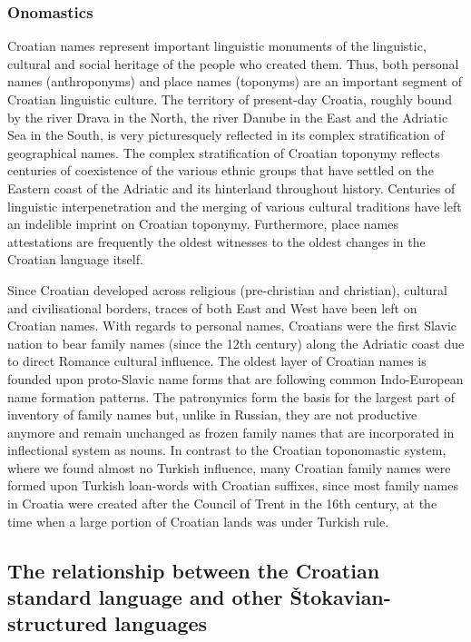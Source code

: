\begin{multicols}{2}
\subsubsection{Onomastics}

Croatian names represent important linguistic monuments of the linguistic, cultural and social heritage of the people who created them. Thus, both personal names (anthroponyms) and place names (toponyms) are an important segment of Croatian linguistic culture. The territory of present-day Croatia, roughly bound by the river Drava in the North, the river Danube  in the East and the Adriatic Sea in the South, is very picturesquely reflected in its complex stratification of geographical names. The complex stratification of Croatian toponymy reflects centuries of coexistence of the various ethnic groups that have settled on the Eastern coast of the Adriatic and its hinterland throughout history. Centuries of linguistic interpenetration and the merging of various cultural traditions have left an indelible imprint on Croatian toponymy. Furthermore, place names attestations are frequently the oldest witnesses to the oldest changes in the Croatian language itself. 


Since Croatian developed across religious (pre-christian and christian), cultural and civilisational borders, traces of both East and West have been left on Croatian names. With regards to personal names, Croatians were the first Slavic nation to bear family names (since the 12th century) along the Adriatic coast due to direct Romance cultural influence. The oldest layer of Croatian names is founded upon proto-Slavic name forms that are following common Indo-European name formation patterns. The patronymics form the basis for the largest part of inventory of family names but, unlike in Russian, they are not productive anymore and remain unchanged as frozen family names that are incorporated in inflectional system as nouns. In contrast to the Croatian toponomastic system, where we found almost no Turkish influence, many Croatian family names were formed upon Turkish loan-words with Croatian suffixes, since most family names in Croatia were created after the Council of Trent in the 16th century, at the time when a large portion of Croatian lands was under Turkish rule.

\subsection{The relationship between the Croatian standard language and other Štokavian-structured languages}


\end{multicols}
